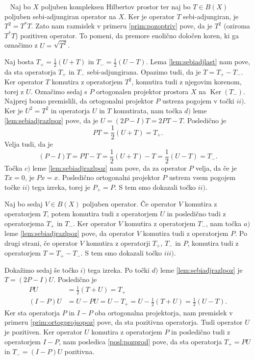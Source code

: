 \documentclass[12pt,a4paper,oneside,fleqn,openany]{book}
\newcommand{\eopf}{\raisebox{0.8ex}{\framebox{}}} %
\newenvironment{dokaz}%
{\noindent{\bf Dokaz.}\ }%
{\hfill\eopf\par\bigskip}%
\begin{document}
\begin{dokaz}
	Naj bo $X$ poljuben kompleksen Hilbertov prostor ter naj bo $T\in B(X)$ poljuben sebi-adjungiran operator na $X$. 
	Ker je operator $T$ sebi-adjungiran, je $T^2 = T^*T$. Zato nam razmislek v primeru \ref{prim:pozoptriv} pove, da je $T^2$ (oziroma $T^*T$) pozitiven operator. To pomeni, da premore enolično določen koren, ki ga označimo z $U = \sqrt{T^2}$. 
	
	Naj bosta $T_+=\frac{1}{2}(U+T)$ in $T_-=\frac{1}{2}(U-T)$. Lema \ref{lem:sebiadjlast} nam pove, da sta operatorja $T_+$ in $T_-$ sebi-adjungirana. Opazimo tudi, da je $T=T_+ - T_-$. Ker operator $T$ komutira z operatorjem $T^2$, komutira tudi z njegovim korenom, torej z $U$. Označimo sedaj s $P$ ortogonalen projektor prostora $X$ na $\operatorname{Ker}(T_-)$. Najprej bomo premislili, da ortogonalni projektor $P$ ustreza pogojem v točki $ii)$. Ker je $U^2 = T^2$ in operatorja $U$ in $T$ komutirata, nam točka $d)$ leme \ref{lem:sebiadjrazlpoz} pove, da je $U = (2P-I)T = 2PT - T$. Posledično je $$PT=\frac{1}{2}(U+T)=T_+.$$
	Velja tudi, da je $$(P-I)T = PT-T=\frac{1}{2}(U+T)-T=\frac{1}{2}(U-T)=T_-.$$ Točka $c)$ leme \ref{lem:sebiadjrazlpoz} nam pove, da za operator $P$ velja, da če je $Tx=0$, je $Px=x$. Posledično ortogonalni projektor $P$ ustreza vsem pogojem točke $ii)$ tega izreka, torej je $P_+=P$. S tem smo dokazali točko $ii)$.
	
	Naj bo sedaj $V\in B(X)$ poljuben operator. Če operator $V$ komutira z operatorjem $T$, potem komutira tudi z operatorjem $U$ in posledično tudi z operatorjema $T_+$ in $T_-$. Ker operator $V$ komutira z operatorjem $T_-$, nam točka $a)$ leme \ref{lem:sebiadjrazlpoz} pove, da operator $V$ komutira tudi z operatorjem $P$. Po drugi strani, če operator $V$ komutira z operatorji $T_+$, $T_-$ in $P$, komutira tudi z operatorjem $T=T_+ - T_-$. S tem smo dokazali točko $iii)$.
	
	Dokažimo sedaj še točko $i)$ tega izreka. Po točki $d)$ leme \ref{lem:sebiadjrazlpoz} je $T=(2P - I)U$. Posledično je \begin{align*}
		PU &= \frac{1}{2}(T+U)=T_+ \\
		(I-P)U &= U - PU = U-T_+ =U-\frac{1}{2}(T+U)=\frac{1}{2}(U-T).
	\end{align*}
	Ker sta operatorja $P$ in $I-P$ oba ortogonalna projektorja, nam premislek v primeru \ref{prim:ortogprojsopoz} pove, da sta pozitivna operatorja. Tudi operator $U$ je pozitiven. Ker operator $U$ komutira z operatorjem $P$ in posledično tudi z operatorjem $I-P$, nam posledica \ref{posl:pozprod} pove, da sta operatorja $T_+=PU$ in $T_-=(I-P)U$ pozitivna.
\end{dokaz}
\end{document}
